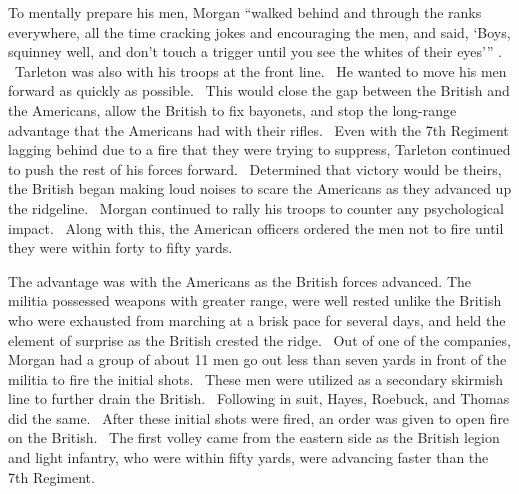 To mentally prepare his men, Morgan “walked behind and through the ranks
everywhere, all the time cracking jokes and encouraging the men, and said,
‘Boys, squinney well, and don’t touch a trigger until you see the whites of
their eyes’” \cite[p.87]{babits_devil_2001}.  Tarleton was also with his troops at the front
line.  He wanted to move his men forward as quickly as possible.  This would
close the gap between the British and the Americans, allow the British to fix
bayonets, and stop the long-range advantage that the Americans had with their
rifles.  Even with the 7th Regiment lagging behind due to a fire that they were
trying to suppress, Tarleton continued to push the rest of his forces forward.
 Determined that victory would be theirs, the British began making loud noises
to scare the Americans as they advanced up the ridgeline.  Morgan continued to
rally his troops to counter any psychological impact.  Along with this, the
American officers ordered the men not to fire until they were within forty to
fifty yards.  

The advantage was with the Americans as the British forces advanced.  The
militia possessed weapons with greater range, were well rested unlike the
British who were exhausted from marching at a brisk pace for several days, and
held the element of surprise as the British crested the ridge.  Out of one of
the companies, Morgan had a group of about 11 men go out less than seven yards
in front of the militia to fire the initial shots.  These men were utilized as a
secondary skirmish line to further drain the British.  Following in suit, Hayes,
Roebuck, and Thomas did the same.  After these initial shots were fired, an
order was given to open fire on the British.  The first volley came from the
eastern side as the British legion and light infantry, who were within fifty
yards, were advancing faster than the 7th Regiment.  

